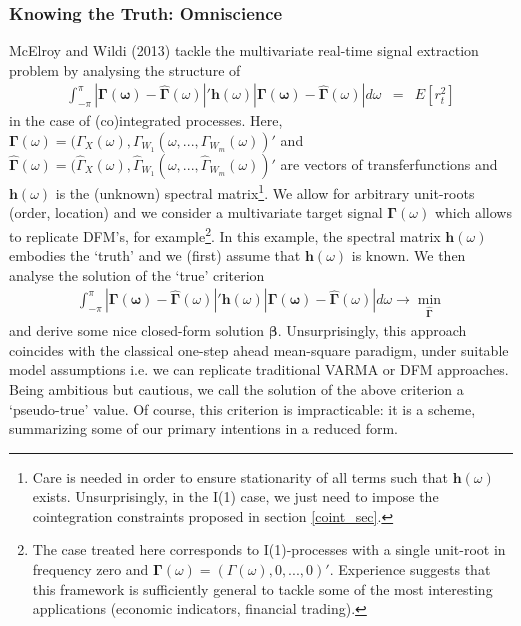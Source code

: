 \documentclass[11pt]{article}
\begin{document}
\subsubsection{Knowing the Truth: Omniscience}

McElroy and Wildi (2013) tackle the multivariate real-time signal extraction problem by analysing the structure of  
\begin{eqnarray*}
\int_{-\pi}^\pi |\mathbf{\Gamma(\omega)-\hat{\Gamma}}(\omega)|' \mathbf{h}(\omega) |\mathbf{\Gamma(\omega)-\hat{\Gamma}}(\omega)|d\omega &=&E[r_t^2]
\end{eqnarray*}
in the case of (co)integrated processes. Here, $\mathbf{\Gamma}(\omega)=(\Gamma_X(\omega),\Gamma_{W_1}(\omega,...,\Gamma_{W_m}(\omega))'$  and $\mathbf{\hat{\Gamma}}(\omega)=(\hat{\Gamma}_X(\omega),\hat{\Gamma}_{W_1}(\omega,...,\hat{\Gamma}_{W_m}(\omega))'$ are vectors of transferfunctions and $\mathbf{h}(\omega)$ is the (unknown) spectral matrix\footnote{Care is needed in order to ensure stationarity of all terms such that $\mathbf{h}(\omega)$ exists. Unsurprisingly, in the I(1) case, we just need to impose the cointegration constraints proposed in section \ref{coint_sec}.}. We allow for arbitrary unit-roots (order, location) and we consider a multivariate target signal $\mathbf{\Gamma}(\omega)$ which allows to replicate DFM's, for example\footnote{ The case treated here corresponds to I(1)-processes with a single unit-root in frequency zero and $\mathbf{\Gamma}(\omega)=(\Gamma(\omega),0,...,0)'$. Experience suggests that this framework is sufficiently general to tackle some of the most interesting applications (economic indicators, financial trading).}. In this example, the spectral matrix $\mathbf{h}(\omega)$ embodies the `truth' and we (first) assume that $\mathbf{h}(\omega)$ is known. We then analyse the solution of the `true' criterion
\begin{eqnarray*}
\int_{-\pi}^\pi |\mathbf{\Gamma(\omega)-\hat{\Gamma}}(\omega)|' \mathbf{h}(\omega) |\mathbf{\Gamma(\omega)-\hat{\Gamma}}(\omega)|d\omega \to\min_{\mathbf{\hat{\Gamma}}}
\end{eqnarray*}
and derive some nice closed-form solution $\mathbf{\beta}$. Unsurprisingly, this approach coincides with the classical one-step ahead mean-square paradigm, under suitable model assumptions i.e. we can replicate traditional VARMA or DFM approaches. Being ambitious but cautious, we call the solution of the above criterion a `pseudo-true' value. Of course, this criterion is impracticable: it is a scheme, summarizing some of our primary intentions in a reduced form. 
\end{document}
